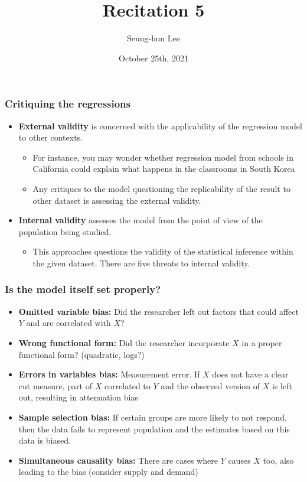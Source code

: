 \documentclass[aspectratio=169]{beamer}
\title[Recitation 5]{Recitation 5} %
\author[Seung-hun Lee]{Seung-hun Lee}
\institute[Columbia University]{Columbia University}
\date[October 25th, 2021]{October 25th, 2021}
\begin{document}
\begin{frame}
\titlepage
\end{frame}


\begin{frame}
\frametitle{Critiquing the regressions}
\begin{itemize}
\item \textbf{External validity} is concerned with the applicability of the regression model to other contexts. 
\begin{itemize}
\item For instance, you may wonder whether regression model from schools in California could explain what happens in the classrooms in South Korea
\item Any critiques to the model questioning the replicability of the  result to other dataset is assessing the external validity. 
\end{itemize}
\item \textbf{Internal validity} assesses the model from the point of view of the population being studied. 
\begin{itemize}
\item This approaches questions the validity of the statistical inference within the given dataset. There are five threats to internal validity.
\end{itemize}
\end{itemize}
\end{frame}

\begin{frame}
\frametitle{Is the model itself set properly?}
\begin{itemize}
\item \textbf{Omitted variable bias: } Did the researcher left out factors that could affect $Y$ and are correlated with $X$? 
\item \textbf{Wrong functional form: } Did the researcher incorporate $X$ in a proper functional form? (quadratic, logs?)
\item \textbf{Errors in variables bias: } Measurement error. If $X$ does not have a clear cut measure, part of $X$ correlated to $Y$ and the observed version of $X$ is left out, resulting in attenuation bias
\item \textbf{Sample selection bias: }  If certain groups are more likely to not respond, then the data fails to represent population and the estimates based on this data is biased.
\item \textbf{Simultaneous causality bias: } There are cases where $Y$ causes $X$ too, also leading to the bias (consider supply and demand)
\end{itemize}
\end{frame}
\end{document}
